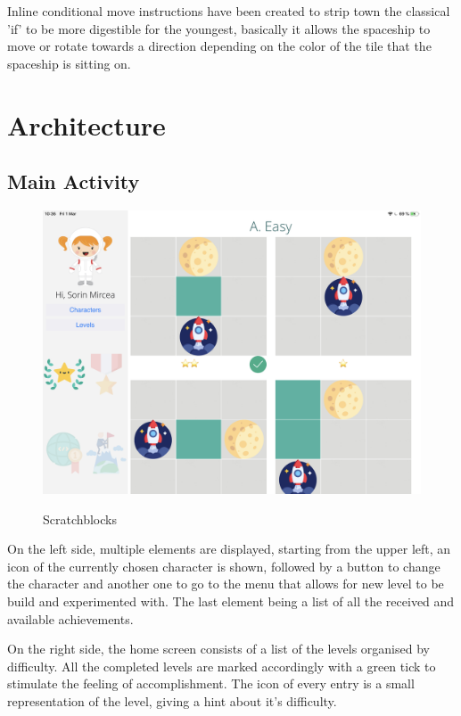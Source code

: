 \documentclass[12 pct]{report}
\begin{document}
Inline conditional move instructions have been created to strip town the classical 'if'  to be more digestible for the youngest, basically it allows the spaceship to move or rotate towards a direction depending on the color  of the tile that the spaceship is sitting on.
\section{Architecture}

\subsection*{Main Activity}
\begin{figure}[H]
\includegraphics[width=1.0\textwidth]{ArRobotCode0}
\centering
\label{fig:hololens}
\caption{Scratchblocks}
\end{figure}

On the left side, multiple elements are displayed, starting from the upper left, an icon of the currently chosen character is shown, followed by a button to change the character and another one to go to the menu that allows for new level to be build and experimented with. The last element being a list of all the received and available achievements.

On the right side, the home screen consists of a list of the levels organised by difficulty. All the completed levels are marked accordingly with a green tick to stimulate the feeling of accomplishment. The icon of every entry is a small representation of the level, giving a hint about it's difficulty. 
\end{document}
